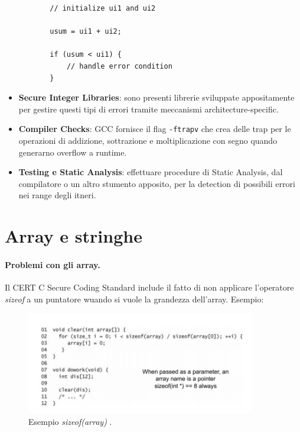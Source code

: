\begin{itemize}
\begin{itemize}
\begin{lstlisting}
    // initialize ui1 and ui2

    usum = ui1 + ui2;

    if (usum < ui1) {
        // handle error condition
    }
                    \end{lstlisting}
          \end{itemize}
    \item \textbf{Secure Integer Libraries}:
          sono presenti librerie sviluppate appositamente per gestire questi
          tipi di errori tramite meccanismi architecture-specific.
    \item \textbf{Compiler Checks}:
          GCC fornisce il flag \verb|-ftrapv| che crea delle trap per le
          operazioni di addizione, sottrazione e moltiplicazione con segno
          quando generarno overflow a runtime.
    \item \textbf{Testing e Static Analysis}:
          effettuare procedure di Static Analysis,
          dal compilatore o un altro stumento apposito,
          per la detection di possibili errori nei range degli itneri.
\end{itemize}

\section{Array e stringhe}
\paragraph{Problemi con gli array.}Il  CERT C Secure Coding Standard include il fatto di non applicare l'operatore \textit{sizeof} a un puntatore wuando si vuole la grandezza dell'array.
Esempio:
\begin{figure}[H]
    \centering
    \includegraphics[width=10cm, keepaspectratio]{capitoli/secure_coding/img/cap_2/sizeof_array.png}
    \caption{Esempio \textit{sizeof(array)} .}\label{fig:sizeof_array}
\end{figure}
